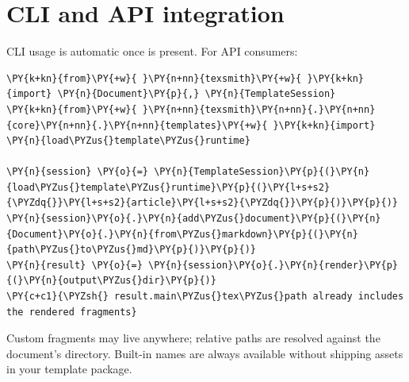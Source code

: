 \documentclass[a4paper,twoside]{article}
\begin{document}
\section{CLI and API integration}
CLI usage is automatic once  is present. For API consumers:
\begin{tscode}[lang=python, engine=pygments]
\begin{Verbatim}[commandchars=\\\{\},breaklines, breakanywhere, commandchars=\\\{\}]
\PY{k+kn}{from}\PY{+w}{ }\PY{n+nn}{texsmith}\PY{+w}{ }\PY{k+kn}{import} \PY{n}{Document}\PY{p}{,} \PY{n}{TemplateSession}
\PY{k+kn}{from}\PY{+w}{ }\PY{n+nn}{texsmith}\PY{n+nn}{.}\PY{n+nn}{core}\PY{n+nn}{.}\PY{n+nn}{templates}\PY{+w}{ }\PY{k+kn}{import} \PY{n}{load\PYZus{}template\PYZus{}runtime}

\PY{n}{session} \PY{o}{=} \PY{n}{TemplateSession}\PY{p}{(}\PY{n}{load\PYZus{}template\PYZus{}runtime}\PY{p}{(}\PY{l+s+s2}{\PYZdq{}}\PY{l+s+s2}{article}\PY{l+s+s2}{\PYZdq{}}\PY{p}{)}\PY{p}{)}
\PY{n}{session}\PY{o}{.}\PY{n}{add\PYZus{}document}\PY{p}{(}\PY{n}{Document}\PY{o}{.}\PY{n}{from\PYZus{}markdown}\PY{p}{(}\PY{n}{path\PYZus{}to\PYZus{}md}\PY{p}{)}\PY{p}{)}
\PY{n}{result} \PY{o}{=} \PY{n}{session}\PY{o}{.}\PY{n}{render}\PY{p}{(}\PY{n}{output\PYZus{}dir}\PY{p}{)}
\PY{c+c1}{\PYZsh{} result.main\PYZus{}tex\PYZus{}path already includes the rendered fragments}
\end{Verbatim}
\end{tscode}
Custom fragments may live anywhere; relative paths are resolved against the
document's directory. Built-in names are always available without shipping
assets in your template package.
\end{document}

